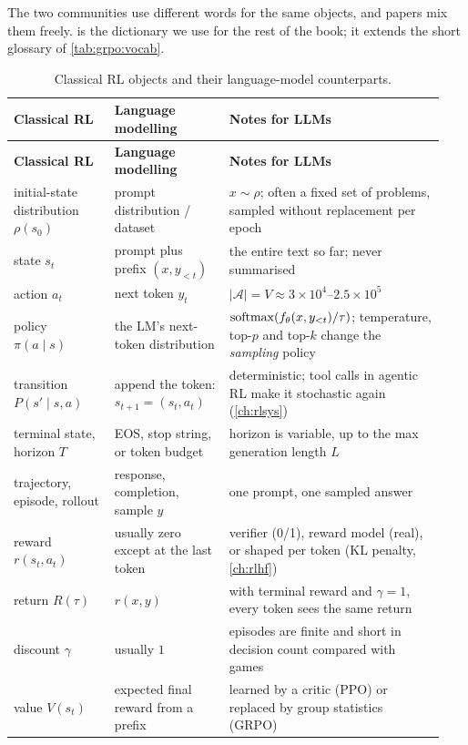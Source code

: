 The two communities use different words for the same objects, and papers mix them freely.
 is the dictionary we use for the rest of the book; it extends the
short glossary of \cref{tab:grpo:vocab}.

{\small
\begin{longtable}{@{}p{0.22\linewidth}p{0.25\linewidth}p{0.47\linewidth}@{}}
\caption{Classical RL objects and their language-model counterparts.}\label{tab:pg:notation}\\
\toprule
\textbf{Classical RL} & \textbf{Language modelling} & \textbf{Notes for LLMs}\\
\midrule\endfirsthead
\toprule
\textbf{Classical RL} & \textbf{Language modelling} & \textbf{Notes for LLMs}\\
\midrule\endhead
initial-state distribution $\rho(s_0)$ & prompt distribution / dataset & $x\sim\rho$; often a fixed set of problems, sampled without replacement per epoch\\
state $s_t$ & prompt plus prefix $(x,y_{<t})$ & the entire text so far; never summarised\\
action $a_t$ & next token $y_t$ & $|\mathcal{A}|=V\approx 3\times10^4$--$2.5\times10^5$\\
policy $\pi(a\mid s)$ & the LM's next-token distribution & $\operatorname{softmax}(f_\theta(x,y_{<t})/\tau)$; temperature, top-$p$ and top-$k$ change the \emph{sampling} policy\\
transition $P(s'\mid s,a)$ & append the token: $s_{t+1}=(s_t,a_t)$ & deterministic; tool calls in agentic RL make it stochastic again (\cref{ch:rlsys})\\
terminal state, horizon $T$ & EOS, stop string, or token budget & horizon is variable, up to the max generation length $L$\\
trajectory, episode, rollout & response, completion, sample $y$ & one prompt, one sampled answer\\
reward $r(s_t,a_t)$ & usually zero except at the last token & verifier (0/1), reward model (real), or shaped per token (KL penalty, \cref{ch:rlhf})\\
return $R(\tau)$ & $r(x,y)$ & with terminal reward and $\gamma=1$, every token sees the same return\\
discount $\gamma$ & usually $1$ & episodes are finite and short in decision count compared with games\\
value $V(s_t)$ & expected final reward from a prefix & learned by a critic (PPO) or replaced by group statistics (GRPO)\\

\end{longtable}}
